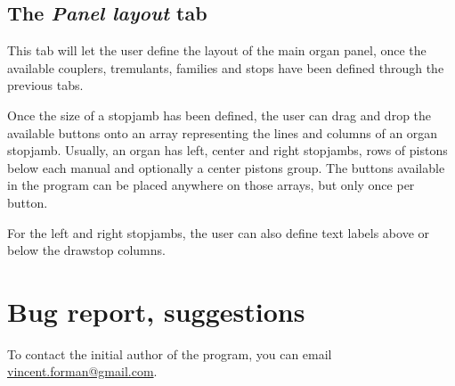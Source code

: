 \documentclass[a4paper,twoside,12pt]{extarticle}
\begin{document}
\subsection{The \textit{Panel layout} tab}

This tab will let the user define the layout of the main organ panel, once the available couplers, tremulants, families and stops have been defined through the previous tabs.

Once the size of a stopjamb has been defined, the user can drag and drop the available buttons onto an array representing the lines and columns of an organ stopjamb. Usually, an organ has left, center and right stopjambs, rows of pistons below each manual and optionally a center pistons group. The buttons available in the program can be placed anywhere on those arrays, but only once per button.

For the left and right stopjambs, the user can also define text labels above or below the drawstop columns.

\section{Bug report, suggestions}

To contact the initial author of the program, you can email \href{mailto:vincent.forman@gmail.com}{vincent.forman@gmail.com}.
\end{document}
